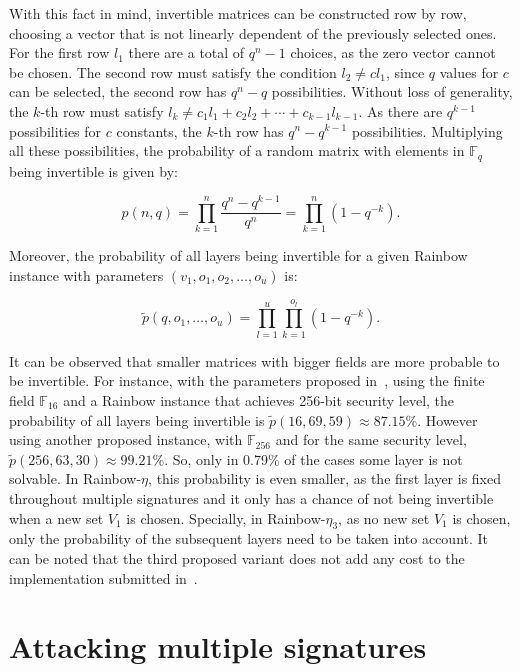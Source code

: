 \documentclass{ufsctex/ufsctex}
\begin{document}
With this fact in mind, invertible matrices can be constructed row by row,
choosing a vector that is not linearly dependent of the previously selected
ones. For the first row $l_1$ there are a total of $q^n - 1$ choices, as the
zero vector cannot be chosen. The second row must satisfy the condition $l_2
\neq c l_1$, since $q$ values for $c$ can be selected, the second row has $q^n
- q$ possibilities. Without loss of generality, the $k$-th row must satisfy
$l_k \ne c_1l_1 + c_2l_2 + \cdots + c_{k-1}l_{k-1}$. As there are $q^{k-1}$
possibilities for $c$ constants, the $k$-th row has $q^n - q^{k-1}$
possibilities. Multiplying all these possibilities, the probability of a random
matrix with elements in $\mathbb{F}_q$ being invertible is given by:

\begin{equation}
p(n, q) = \prod_{k=1}^{n} \frac{q^n - q^{k-1}}{q^n}
= \prod_{k=1}^{n} \left( 1 - q^{-k} \right).
\end{equation}

Moreover, the probability of all layers being invertible for a given Rainbow
instance with parameters $(v_1, o_1, o_2, \ldots, o_u)$ is:

\begin{equation}
\tilde{p}(q, o_1, \ldots, o_u) =
	\prod_{l=1}^{u} \prod_{k=1}^{o_l} \left( 1 - q^{-k} \right).
\end{equation}

It can be observed that smaller matrices with bigger fields are more probable
to be invertible. For instance, with the parameters proposed in~\cite[Chapter
6]{petzoldt2013thesis}, using the finite field $\mathbb{F}_{16}$ and a Rainbow
instance that achieves 256-bit security level, the probability of all layers
being invertible is $\tilde{p}(16, 69, 59) \approx 87.15\%$. However using
another proposed instance, with $\mathbb{F}_{256}$ and for the same security
level, $\tilde{p}(256, 63, 30) \approx 99.21\%$. So, only in 0.79\% of the
cases some layer is not solvable. In Rainbow-$\eta$, this probability is even
smaller, as the first layer is fixed throughout multiple signatures and it only
has a chance of not being invertible when a new set $V_1$ is chosen.
Specially, in Rainbow-$\eta_3$, as no new set $V_1$ is chosen, only the
probability of the subsequent layers need to be taken into account. It can be
noted that the third proposed variant does not add any cost to the
implementation submitted in~\cite{ding2017nist}.

\section{Attacking multiple signatures}
\end{document}
